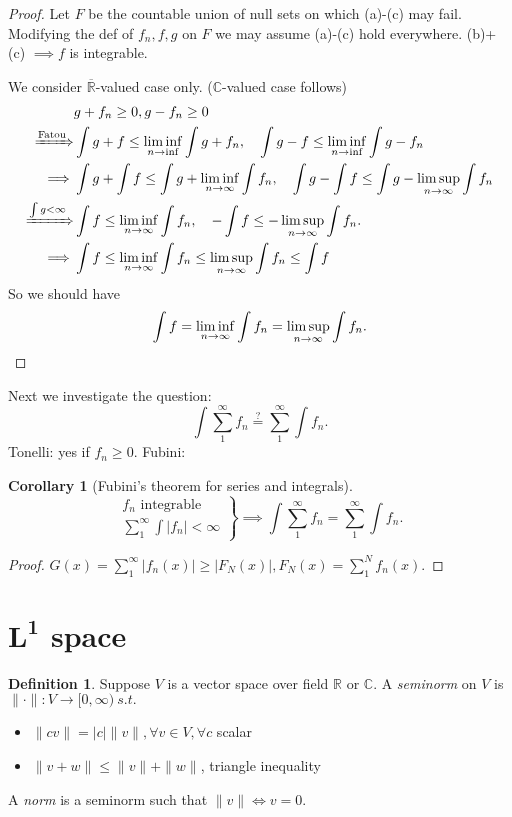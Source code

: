 \documentclass{report}
\newcommand{\R}{\mathbb{R}}
\newcommand{\C}{\mathbb{C}}
\newcommand{\st}{\ s.t.\ }
\newtheorem{corollary}[theorem]{Corollary}
\theoremstyle{definition}
\newtheorem{definition}[theorem]{Definition}
\theoremstyle{remark}
\newcommand*\ttlmath[2]{\texorpdfstring{$\boldsymbol{#1}$}{#2}}
\begin{document}
\begin{proof}
	Let $F$ be the countable union of null sets on which (a)-(c) may fail. Modifying the def of $f_n, f, g$ on $F$ we may assume (a)-(c) hold everywhere. (b)+(c) $\implies f$ is integrable.

	We consider $\overline{\R}$-valued case only. ($\C$-valued case follows)
	\begin{align*}
		& g + f_n \geq 0, g - f_n \geq 0 \\
		\xRightarrow[]{\text{Fatou}} & \int g + f \leq \liminf_{n \to \inf} \int g + f_n,\quad \int g - f \leq \liminf_{n \to \inf} \int g - f_n  \\
		\implies & \int g + \int f \leq \int g + \liminf_{n \to \infty} \int f_n,\quad \int g - \int f \leq \int g - \limsup_{n \to \infty} \int f_n \\
		\xRightarrow[]{\int g < \infty} & \int f \leq \liminf_{n \to \infty} \int f_n,\quad - \int f \leq - \limsup_{n \to \infty} \int f_n. \\
		\implies & \int f \leq \liminf_{n \to \infty} \int f_n \leq \limsup_{n \to \infty} \int f_n \leq \int f
	\end{align*}
	So we should have \[ \int f = \liminf_{n \to \infty} \int f_n = \limsup_{n \to \infty} \int f_n. \qedhere \]
\end{proof}
Next we investigate the question:
\[\int \sum_{1}^\infty f_n \stackrel{\text{?}}{=} \sum_{1}^\infty \int f_n.\]
Tonelli: yes if $f_n \geq 0$.
Fubini:
\begin{corollary}[Fubini's theorem for series and integrals]
	\[\left.\begin{array}{r}
		f_n \text{ integrable} \\
		\displaystyle \sum_1^\infty \int |f_n| < \infty
	\end{array}\right\} \implies \int \sum_{1}^\infty f_n = \sum_{1}^\infty \int f_n.\]
\end{corollary}
\begin{proof}
	$\displaystyle G(x) = \sum_1^\infty |f_n(x)| \geq |F_N(x)|, F_N(x) = \sum_1^N f_n(x)$.
\end{proof}

\section{\ttlmath{L^1}{L-1} space}
\begin{definition}\label{def:seminorm}
	Suppose $V$ is a vector space over field $\R$ or $\C$. A \emph{seminorm}
on $V$ is $\|\cdot\|: V \to [0, \infty) \st$
\begin{itemize}
	\item $\|cv\| = |c|\|v\|, \forall v \in V, \forall c$ scalar
	\item $\|v + w\| \leq \|v\| + \|w\|$, triangle inequality
\end{itemize}
A \emph{norm} is a seminorm such that $\|v\| \iff v = 0$.
\end{definition}
\end{document}
